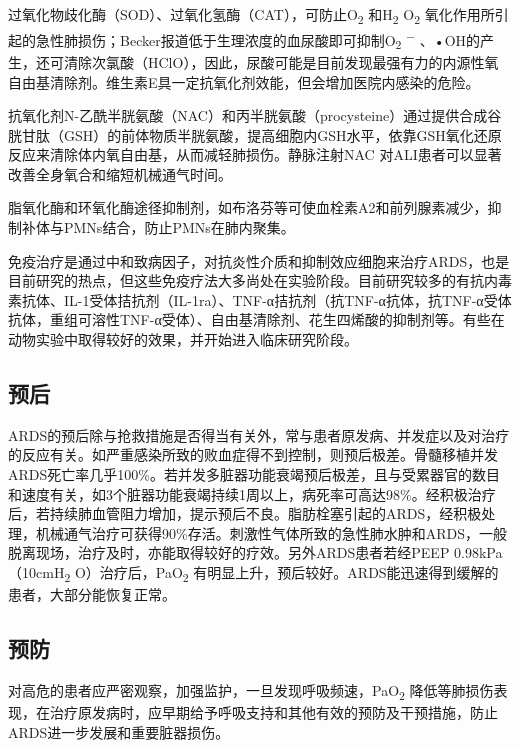 过氧化物歧化酶（SOD）、过氧化氢酶（CAT），可防止O\textsubscript{2}
和H\textsubscript{2} O\textsubscript{2}
氧化作用所引起的急性肺损伤；Becker报道低于生理浓度的血尿酸即可抑制O\textsubscript{2}
\textsuperscript{−}
、•OH的产生，还可清除次氯酸（HClO），因此，尿酸可能是目前发现最强有力的内源性氧自由基清除剂。维生素E具一定抗氧化剂效能，但会增加医院内感染的危险。

抗氧化剂N-乙酰半胱氨酸（NAC）和丙半胱氨酸（procysteine）通过提供合成谷胱甘肽（GSH）的前体物质半胱氨酸，提高细胞内GSH水平，依靠GSH氧化还原反应来清除体内氧自由基，从而减轻肺损伤。静脉注射NAC
对ALI患者可以显著改善全身氧合和缩短机械通气时间。

脂氧化酶和环氧化酶途径抑制剂，如布洛芬等可使血栓素A2和前列腺素减少，抑制补体与PMNs结合，防止PMNs在肺内聚集。

免疫治疗是通过中和致病因子，对抗炎性介质和抑制效应细胞来治疗ARDS，也是目前研究的热点，但这些免疫疗法大多尚处在实验阶段。目前研究较多的有抗内毒素抗体、IL-1受体拮抗剂（IL-1ra）、TNF-α拮抗剂（抗TNF-α抗体，抗TNF-α受体抗体，重组可溶性TNF-α受体）、自由基清除剂、花生四烯酸的抑制剂等。有些在动物实验中取得较好的效果，并开始进入临床研究阶段。

\subsection{预后}

ARDS的预后除与抢救措施是否得当有关外，常与患者原发病、并发症以及对治疗的反应有关。如严重感染所致的败血症得不到控制，则预后极差。骨髓移植并发ARDS死亡率几乎100\%。若并发多脏器功能衰竭预后极差，且与受累器官的数目和速度有关，如3个脏器功能衰竭持续1周以上，病死率可高达98\%。经积极治疗后，若持续肺血管阻力增加，提示预后不良。脂肪栓塞引起的ARDS，经积极处理，机械通气治疗可获得90\%存活。刺激性气体所致的急性肺水肿和ARDS，一般脱离现场，治疗及时，亦能取得较好的疗效。另外ARDS患者若经PEEP
0.98kPa（10cmH\textsubscript{2} O）治疗后，PaO\textsubscript{2}
有明显上升，预后较好。ARDS能迅速得到缓解的患者，大部分能恢复正常。

\subsection{预防}

对高危的患者应严密观察，加强监护，一旦发现呼吸频速，PaO\textsubscript{2}
降低等肺损伤表现，在治疗原发病时，应早期给予呼吸支持和其他有效的预防及干预措施，防止ARDS进一步发展和重要脏器损伤。

\protect\hypertarget{text00079.html}{}{}

